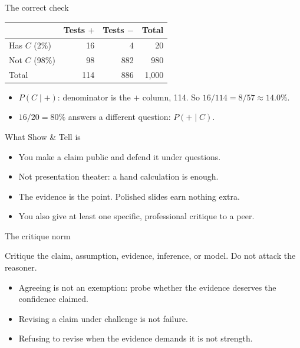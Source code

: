 \documentclass[aspectratio=169,10pt]{beamer}
\begin{document}
\begin{frame}{The correct check}
\centering
\begin{tabular}{l|r|r|r}
 & Tests $+$ & Tests $-$ & Total \\ \hline
Has $C$ (2\%) & 16 & 4 & 20 \\
Not $C$ (98\%) & 98 & 882 & 980 \\ \hline
Total & 114 & 886 & 1{,}000
\end{tabular}
\vspace{3mm}
\begin{itemize}
\item $P(C\mid +)$: denominator is the $+$ column, 114. So $16/114=8/57\approx 14.0\%$.
\item $16/20=80\%$ answers a different question: $P(+\mid C)$.
\end{itemize}
\end{frame}

\begin{frame}{What Show \& Tell is}
\begin{itemize}
\item You make a claim public and defend it under questions.
\item Not presentation theater: a hand calculation is enough.
\item The evidence is the point. Polished slides earn nothing extra.
\item You also give at least one specific, professional critique to a peer.
\end{itemize}
\end{frame}

\begin{frame}{The critique norm}
\begin{block}{Critique the claim, assumption, evidence, inference, or model.}
Do not attack the reasoner.
\end{block}
\begin{itemize}
\item Agreeing is not an exemption: probe whether the evidence deserves the confidence claimed.
\item Revising a claim under challenge is not failure.
\item Refusing to revise when the evidence demands it is not strength.
\end{itemize}
\end{frame}
\end{document}
